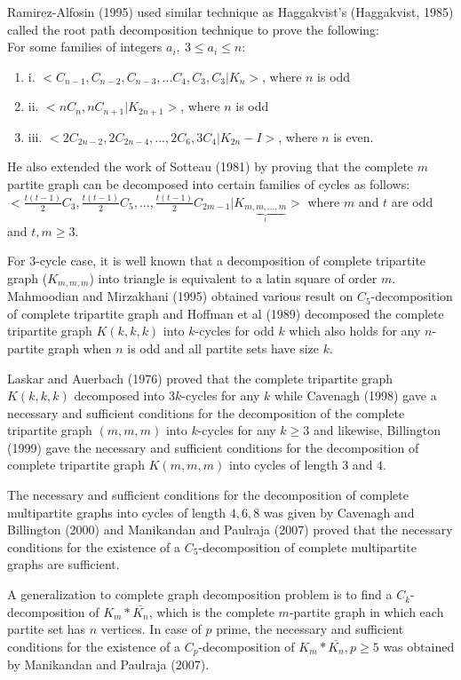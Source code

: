 \documentclass[12pt]{report}
\newcommand{\ben}{\begin{enumerate}}
\newcommand{\een}{\end{enumerate}}
\begin{document}
 Ramirez-Alfosin (1995) %
  used similar technique as Haggakvist's (Haggakvist, 1985) %
   called the root path decomposition technique to prove
the following: \\
For some families of integers $a_i, \ 3\leq a_i\leq n$:
 \ben
\item[i.] $<C_{n-1},C_{n-2},C_{n-3},...C_4,C_3,C_3|K_n>$, where $n$ is odd
\item[ii.] $< nC_n,nC_{n+1}|K_{2n+1}>$, where $n$ is odd
\item[iii.] $<2C_{2n-2},2C_{2n-4},...,2C_6,3C_4|K_{2n}-I>$, where $n$ is even.
\een
He also extended the work of Sotteau (1981) %
by proving that the complete $m$ partite graph  can be decomposed into certain families of cycles  as follows:\\
$<\frac{t(t-1)}{2}C_3,\frac{t(t-1)}{2}C_5,...,\frac{t(t-1)}{2}C_{2m-1}|K_{\underbrace{m,m,...,m}_t}>$
where $m$ and $t$ are odd and $t,m\geq 3$.

For  $3$-cycle case, it is well known that a decomposition of
complete  tripartite graph ($K_{m,m,m}$)  into triangle is
equivalent to a latin square of order $m$. Mahmoodian and Mirzakhani (1995) %
obtained various result on $C_5$-decomposition of complete tripartite graph and Hoffman  et al (1989) %
 decomposed the complete tripartite graph $K(k,k,k)$ into $k$-cycles for odd $k$ which also holds for any $n$-partite graph when $n$ is odd and all partite sets have size $k$.

Laskar and Auerbach (1976) %
proved that the complete tripartite graph $K(k,k,k)$ decomposed into
$3k$-cycles for
any $k$ while Cavenagh (1998) %
 gave a necessary and sufficient conditions
for the decomposition of the complete tripartite graph $(m,m,m)$
into $k$-cycles for any $k\geq 3$ and likewise,
Billington (1999) %
gave the necessary and sufficient conditions for  the decomposition
of complete tripartite graph  $K(m,m,m)$ into cycles of length $3$
and $4$.


The necessary and sufficient conditions for the decomposition of
complete multipartite graphs into cycles of length $4,6,8$ was given
by Cavenagh  and Billington (2000) and
Manikandan and Paulraja (2007) %
proved that the necessary conditions for the existence of a
$C_5$-decomposition of complete multipartite graphs are sufficient.

 A generalization to complete graph decomposition problem is to find a $C_k$-decomposition of $K_m*\bar{K_n}$, which is the complete $m$-partite graph in which each partite set has $n$ vertices.  In case of $p$ prime, the necessary and sufficient conditions for the existence of a $C_p$-decomposition of $K_m*\bar{K_n},p\geq 5$ was obtained by Manikandan and Paulraja (2007).%
\end{document}
